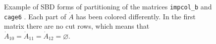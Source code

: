 \begin{figure}[h]
	\centering
	 \hspace{1cm}
	\caption{Example of SBD forms of partitioning of the matrices \texttt{impcol\_b} and \texttt{cage6} \cite{ufl}. Each part of $\dot{A}$ has been colored differently. In the first matrix there are no cut rows, which means that $\dot{A}_{10}=\dot{A}_{11} =\dot{A}_{12} = \varnothing$.} \label{fig:sbd-2}
\end{figure}

